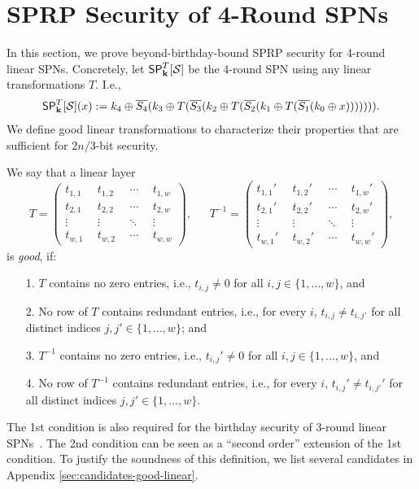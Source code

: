 
\section{SPRP Security of 4-Round SPNs}
\label{section:security of 4-round SPNs}

In this section, we prove beyond-birthday-bound SPRP security for 4-round linear SPNs. Concretely, let $\mathsf{SP}_{\mathbf{k}}^T[\mathcal{S}]$ be the 4-round SPN using any linear transformations $T$. I.e.,
%
\begin{align}
\mathsf{SP}_{\mathbf{k}}^T[\mathcal{S}](x):=k_4\oplus\overline{S_4}(k_3\oplus T(\overline{S_3}(k_2\oplus T(\overline{S_2}(k_1\oplus T(\overline{S_1}(k_0\oplus x))))))).
\label{eq:defn-4-round-spn}
\end{align}
%
We define good linear transformations to characterize their properties that are sufficient for $2n/3$-bit security.


\begin{definition}
	\label{defn:good-T}
	
	We say that a linear layer
	\[
	T=
	\left(
	\begin{array}{cccc}
	t_{1,1}~ & ~t_{1,2}~ & ~\cdots~ & ~t_{1,w}  \\
	t_{2,1}~ & ~t_{2,2}~ & ~\cdots~ & ~t_{2,w}  \\
	\vdots~   & ~\vdots~  &~\ddots~ & ~\vdots   \\
	t_{w,1}~ & ~t_{w,2}~ & ~\cdots~ & ~t_{w,w}  
	\end{array}
	\right),\ \ \ \ \ \ \ 
	T^{-1}=
	\left(
	\begin{array}{cccc}
	t_{1,1}'~ & ~t_{1,2}'~ & ~\cdots~ & ~t_{1,w}'  \\
	t_{2,1}'~ & ~t_{2,2}'~ & ~\cdots~ & ~t_{2,w}'  \\
	\vdots~   & ~\vdots~  &~\ddots~ & ~\vdots   \\
	t_{w,1}'~ & ~t_{w,2}'~ & ~\cdots~ & ~t_{w,w}'  
	\end{array}
	\right),
	\]
	is {\it good}, if:
	\begin{enumerate}
		\item[1.] $T$ contains no zero entries, i.e., $t_{i,j}\neq 0$ for all $i,j\in\{1,\ldots,w\}$, and
		\item[2.] No row of $T$ contains redundant entries, i.e., for every $i$, $t_{i,j}\neq t_{i,j'}$ for all distinct indices $j,j'\in\{1,\ldots,w\}$; and
		\item[3.] $T^{-1}$ contains no zero entries, i.e., $t_{i,j}'\neq 0$ for all $i,j\in\{1,\ldots,w\}$, and
		\item[4.] No row of $T^{-1}$ contains redundant entries, i.e., for every $i$, $t_{i,j}'\neq t_{i,j'}'$ for all distinct indices $j,j'\in\{1,\ldots,w\}$.
	\end{enumerate}
\end{definition}
%
The 1st condition is also required for the birthday security of 3-round linear SPNs~\cite[Sect. 3]{EPRINT:DKSTZ17}. The 2nd condition can be seen as a ``second order'' extension of the 1st condition. To justify the soundness of this definition, we list several candidates in Appendix \ref{sec:candidates-good-linear}.



